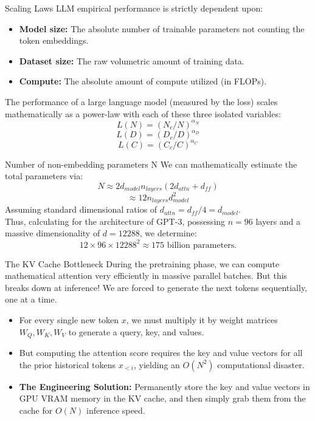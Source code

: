 \documentclass[aspectratio=169]{beamer}
\begin{document}
\begin{frame}{Scaling Laws}\justifying
    LLM empirical performance is strictly dependent upon:
    \begin{itemize}
        \item \textbf{Model size:} The absolute number of trainable parameters not counting the token embeddings.
        \item \textbf{Dataset size:} The raw volumetric amount of training data.
        \item \textbf{Compute:} The absolute amount of compute utilized (in FLOPs).
    \end{itemize}
    The performance of a large language model (measured by the loss) scales mathematically as a power-law with each of these three isolated variables:
    \[ L(N) = (N_c/N)^{\alpha_N} \]
    \[ L(D) = (D_c/D)^{\alpha_D} \]
    \[ L(C) = (C_c/C)^{\alpha_C} \]
\end{frame}

\begin{frame}{Number of non-embedding parameters N}\justifying
    We can mathematically estimate the total parameters via:
    \[ N \approx 2 d_{model} n_{layers} (2d_{attn} + d_{ff}) \]
    \[ \approx 12 n_{layers} d_{model}^2 \]
    Assuming standard dimensional ratios of $d_{attn} = d_{ff}/4 = d_{model}$. \\
    \vspace{0.5cm}
    Thus, calculating for the architecture of GPT-3, possessing $n=96$ layers and a massive dimensionality of $d=12288$, we determine:
    \[ 12 \times 96 \times 12288^2 \approx 175 \text{ billion parameters.} \]
\end{frame}

\begin{frame}{The KV Cache Bottleneck}\justifying
    During the pretraining phase, we can compute mathematical attention very efficiently in massive parallel batches. But this breaks down at inference! We are forced to generate the next tokens sequentially, one at a time.
    \begin{itemize}
        \item For every single new token $x$, we must multiply it by weight matrices $W_Q, W_K, W_V$ to generate a query, key, and values.
        \item But computing the attention score requires the key and value vectors for all the prior historical tokens $x_{<i}$, yielding an $O(N^2)$ computational disaster.
        \item \textbf{The Engineering Solution:} Permanently store the key and value vectors in GPU VRAM memory in the KV cache, and then simply grab them from the cache for $O(N)$ inference speed.
    \end{itemize}
\end{frame}
\end{document}
